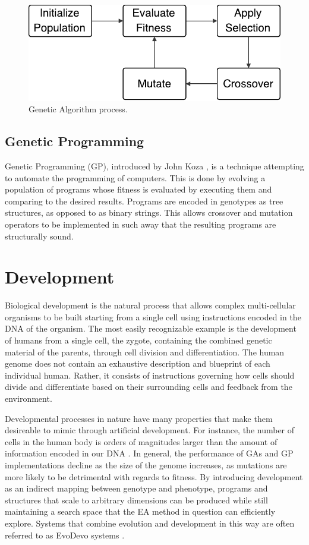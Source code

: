 \begin{figure}[ht]
  \centering
  \includegraphics[width=0.5\linewidth]{fig/ga}
  \caption[Genetic Algorithm process]{Genetic Algorithm process.}
  \label{fig:ga}
\end{figure}

\subsection{Genetic Programming}

Genetic Programming (GP), introduced by John Koza \cite{Koza:1992:GPP:138936},
is a technique attempting to automate the programming of computers. This is done
by evolving a population of programs whose fitness is evaluated by executing
them and comparing to the desired results. Programs are encoded in genotypes as
tree structures, as opposed to as binary strings. This allows crossover and
mutation operators to be implemented in such away that the resulting programs
are structurally sound.


\section{Development}
\label{sec:development}

Biological development is the natural process that allows complex multi-cellular
organisms to be built starting from a single cell using instructions encoded in
the DNA of the organism. The most easily recognizable example is the development
of humans from a single cell, the zygote, containing the combined genetic
material of the parents, through cell division and differentiation. The human
genome does not contain an exhaustive description and blueprint of each
individual human. Rather, it consists of instructions governing how cells should
divide and differentiate based on their surrounding cells and feedback from the
environment.

Developmental processes in nature have many properties that make them desireable
to mimic through artificial development. For instance, the number of cells in
the human body is orders of magnitudes larger than the amount of information
encoded in our DNA \cite{Bianconi2013}. In general, the performance of GAs and
GP implementations decline as the size of the genome increases, as mutations are
more likely to be detrimental with regards to fitness. By introducing
development as an indirect mapping between genotype and phenotype, programs and
structures that scale to arbitrary dimensions can be produced while still
maintaining a search space that the EA method in question can efficiently
explore. Systems that combine evolution and development in this way are often
referred to as EvoDevo systems \cite{Hall2003}.

